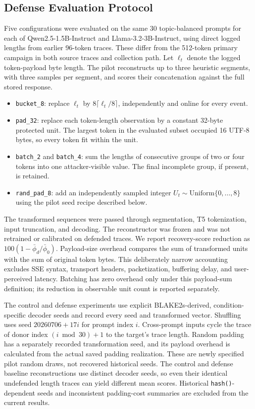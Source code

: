 \documentclass[electronics,article,submit,pdftex,moreauthors]{Definitions/mdpi}
\begin{document}
\subsection{Defense Evaluation Protocol}
Five configurations were evaluated on the same 30 topic-balanced prompts for each of Qwen2.5-1.5B-Instruct and Llama-3.2-3B-Instruct, using direct logged lengths from earlier 96-token traces. These differ from the 512-token primary campaign in both source traces and collection path. Let $\ell_t$ denote the logged token-payload byte length. The pilot reconstructs up to three heuristic segments, with three samples per segment, and scores their concatenation against the full stored response.
\begin{itemize}[leftmargin=2em]
    \item \texttt{bucket\_8}: replace $\ell_t$ by $8\lceil \ell_t/8\rceil$, independently and online for every event.
    \item \texttt{pad\_32}: replace each token-length observation by a constant 32-byte protected unit. The largest token in the evaluated subset occupied 16 UTF-8 bytes, so every token fit within the unit.
    \item \texttt{batch\_2} and \texttt{batch\_4}: sum the lengths of consecutive groups of two or four tokens into one attacker-visible value. The final incomplete group, if present, is retained.
    \item \texttt{rand\_pad\_8}: add an independently sampled integer $U_t\sim\mathrm{Uniform}\{0,\ldots,8\}$ using the pilot seed recipe described below.
\end{itemize}
The transformed sequences were passed through segmentation, T5 tokenization, input truncation, and decoding. The reconstructor was frozen and was not retrained or calibrated on defended traces. We report recovery-score reduction as $100(1-\bar\phi_d/\bar\phi_0)$. Payload-size overhead compares the sum of transformed units with the sum of original token bytes. This deliberately narrow accounting excludes SSE syntax, transport headers, packetization, buffering delay, and user-perceived latency. Batching has zero overhead only under this payload-sum definition; its reduction in observable unit count is reported separately.

The control and defense experiments use explicit BLAKE2s-derived, condition-specific decoder seeds and record every seed and transformed vector. Shuffling uses seed $20260706+17i$ for prompt index $i$. Cross-prompt inputs cycle the trace of donor index $(i\bmod30)+1$ to the target's trace length. Random padding has a separately recorded transformation seed, and its payload overhead is calculated from the actual saved padding realization. These are newly specified pilot random draws, not recovered historical seeds. The control and defense baseline reconstructions use distinct decoder seeds, so even their identical undefended length traces can yield different mean scores. Historical \texttt{hash()}-dependent seeds and inconsistent padding-cost summaries are excluded from the current results.
\end{document}
